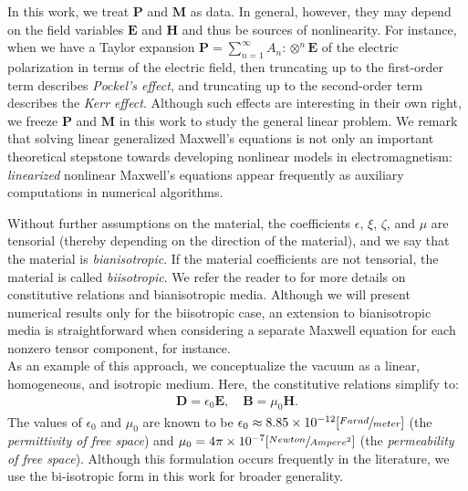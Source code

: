 \documentclass[journal,transmag]{IEEEtran}
\newcommand*\VF[1]{\mathbf{#1}}
\begin{document}
In this work, we treat $\VF{P}$ and $\VF{M}$ as data.
In general, however, they may depend on the field variables $\VF{E}$ and $\VF{H}$ and thus be sources of nonlinearity.
For instance, when we have a Taylor expansion $\VF{P} = \sum_{n=1}^{\infty} A_n : \otimes^{n} \VF{E}$
of the electric polarization in terms of the electric field, 
then truncating up to the first-order term describes \emph{Pockel's effect},
and truncating up to the second-order term describes the \emph{Kerr effect}.
Although such effects are interesting in their own right,
we freeze $\VF{P}$ and $\VF{M}$ in this work to study the general linear problem.
We remark that solving linear generalized Maxwell's equations is not only an important theoretical stepstone towards developing nonlinear models in electromagnetism:
\emph{linearized} nonlinear Maxwell's equations appear frequently as auxiliary computations in numerical algorithms. 


Without further assumptions on the material,
the coefficients $\epsilon$, $\xi$, $\zeta$, and $\mu$ are tensorial 
(thereby depending on the direction of the material), 
and we say that the material is \emph{bianisotropic}.
If the material coefficients are not tensorial, the material is called \emph{biisotropic}.
We refer the reader to 
\cite{lukas2013ETHnotes,jackson1999classical,dmitriev2000constitutive}
for more details on constitutive relations and bianisotropic media.
Although we will present numerical results only for the biisotropic case,
an extension to bianisotropic media is straightforward
when considering a separate Maxwell equation for each nonzero tensor component, for instance.
\\
    
As an example of this approach, we conceptualize the vacuum as a linear, homogeneous, and isotropic medium.
Here, the constitutive relations simplify to: 
\begin{align*}
    \VF{D} = \epsilon_{0}\VF{E}, \quad \VF{B} = \mu_{0}\VF{H}.
\end{align*} 
The values of $\epsilon_{0}$ and $\mu_{0}$ are known to be $\epsilon_{0}\approx 8.85\times 10^{-12} [\sfrac{Farad}{meter}]$ (the \emph{permittivity of free space})
and $\mu_{0}= 4\pi\times 10^{-7} [\sfrac{Newton}{Ampere^2}]$ (the \emph{permeability of free space}). 
Although this formulation occurs frequently in the literature, we use the bi-isotropic form in this work for broader generality.




    
\end{document}
